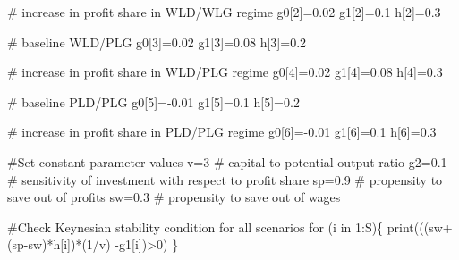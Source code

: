 \documentclass[
  letterpaper,
  DIV=11,
  numbers=noendperiod]{scrreprt}
\newenvironment{Shaded}{\begin{snugshade}}{\end{snugshade}}
\newcommand{\CommentTok}[1]{\textcolor[rgb]{0.37,0.37,0.37}{#1}}
\newcommand{\ControlFlowTok}[1]{\textcolor[rgb]{0.00,0.23,0.31}{#1}}
\newcommand{\DecValTok}[1]{\textcolor[rgb]{0.68,0.00,0.00}{#1}}
\newcommand{\FloatTok}[1]{\textcolor[rgb]{0.68,0.00,0.00}{#1}}
\newcommand{\FunctionTok}[1]{\textcolor[rgb]{0.28,0.35,0.67}{#1}}
\newcommand{\NormalTok}[1]{\textcolor[rgb]{0.00,0.23,0.31}{#1}}
\newcommand{\OtherTok}[1]{\textcolor[rgb]{0.00,0.23,0.31}{#1}}
\newcommand{\SpecialCharTok}[1]{\textcolor[rgb]{0.37,0.37,0.37}{#1}}
\begin{document}
\begin{Shaded}
\begin{Highlighting}[]
\CommentTok{\# increase in profit share in WLD/WLG regime}
\NormalTok{g0[}\DecValTok{2}\NormalTok{]}\OtherTok{=}\FloatTok{0.02}
\NormalTok{g1[}\DecValTok{2}\NormalTok{]}\OtherTok{=}\FloatTok{0.1}
\NormalTok{h[}\DecValTok{2}\NormalTok{]}\OtherTok{=}\FloatTok{0.3}

\CommentTok{\# baseline WLD/PLG}
\NormalTok{g0[}\DecValTok{3}\NormalTok{]}\OtherTok{=}\FloatTok{0.02}
\NormalTok{g1[}\DecValTok{3}\NormalTok{]}\OtherTok{=}\FloatTok{0.08}
\NormalTok{h[}\DecValTok{3}\NormalTok{]}\OtherTok{=}\FloatTok{0.2}

\CommentTok{\# increase in profit share in WLD/PLG regime}
\NormalTok{g0[}\DecValTok{4}\NormalTok{]}\OtherTok{=}\FloatTok{0.02}
\NormalTok{g1[}\DecValTok{4}\NormalTok{]}\OtherTok{=}\FloatTok{0.08}
\NormalTok{h[}\DecValTok{4}\NormalTok{]}\OtherTok{=}\FloatTok{0.3}
  
\CommentTok{\# baseline PLD/PLG}
\NormalTok{g0[}\DecValTok{5}\NormalTok{]}\OtherTok{=}\SpecialCharTok{{-}}\FloatTok{0.01}
\NormalTok{g1[}\DecValTok{5}\NormalTok{]}\OtherTok{=}\FloatTok{0.1}
\NormalTok{h[}\DecValTok{5}\NormalTok{]}\OtherTok{=}\FloatTok{0.2}

\CommentTok{\# increase in profit share in PLD/PLG regime}
\NormalTok{g0[}\DecValTok{6}\NormalTok{]}\OtherTok{=}\SpecialCharTok{{-}}\FloatTok{0.01}
\NormalTok{g1[}\DecValTok{6}\NormalTok{]}\OtherTok{=}\FloatTok{0.1}
\NormalTok{h[}\DecValTok{6}\NormalTok{]}\OtherTok{=}\FloatTok{0.3}

\CommentTok{\#Set constant parameter values}
\NormalTok{v}\OtherTok{=}\DecValTok{3}    \CommentTok{\# capital{-}to{-}potential output ratio}
\NormalTok{g2}\OtherTok{=}\FloatTok{0.1} \CommentTok{\# sensitivity of investment with respect to profit share}
\NormalTok{sp}\OtherTok{=}\FloatTok{0.9} \CommentTok{\# propensity to save out of profits}
\NormalTok{sw}\OtherTok{=}\FloatTok{0.3} \CommentTok{\# propensity to save out of wages}

\CommentTok{\#Check Keynesian stability condition for all scenarios}
\ControlFlowTok{for}\NormalTok{ (i }\ControlFlowTok{in} \DecValTok{1}\SpecialCharTok{:}\NormalTok{S)\{}
\FunctionTok{print}\NormalTok{(((sw}\SpecialCharTok{+}\NormalTok{(sp}\SpecialCharTok{{-}}\NormalTok{sw)}\SpecialCharTok{*}\NormalTok{h[i])}\SpecialCharTok{*}\NormalTok{(}\DecValTok{1}\SpecialCharTok{/}\NormalTok{v) }\SpecialCharTok{{-}}\NormalTok{g1[i])}\SpecialCharTok{\textgreater{}}\DecValTok{0}\NormalTok{)}
\NormalTok{\}}
\end{Highlighting}
\end{Shaded}
\end{document}
